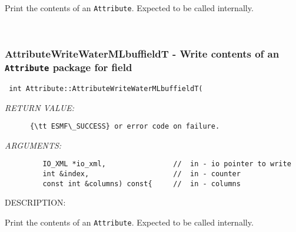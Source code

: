       Print the contents of an {\tt Attribute}.  Expected to be
      called internally.
   
 
\mbox{}\hrulefill\
 
\subsubsection [AttributeWriteWaterMLbuffieldT] {AttributeWriteWaterMLbuffieldT - Write contents of an {\tt Attribute} package for field}


  
\begin{verbatim} int Attribute::AttributeWriteWaterMLbuffieldT(\end{verbatim}{\em RETURN VALUE:}
\begin{verbatim}      {\tt ESMF\_SUCCESS} or error code on failure.\end{verbatim}{\em ARGUMENTS:}
\begin{verbatim}         IO_XML *io_xml,                //  in - io pointer to write
         int &index,                    //  in - counter
         const int &columns) const{     //  in - columns\end{verbatim}
{\sf DESCRIPTION:\\ }


      Print the contents of an {\tt Attribute}.  Expected to be
      called internally.
  
\setlength{\parskip}{\oldparskip}
\setlength{\parindent}{\oldparindent}
\setlength{\baselineskip}{\oldbaselineskip}
